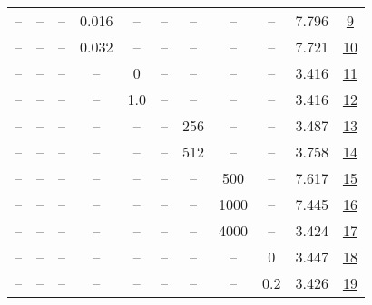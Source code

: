 \begin{table}[H]
\begin{tabular}{ccccccccccc}
-- & -- & -- & 0.016 & -- & -- & -- & -- & -- & 7.796 & \href{https://wandb.ai/stanford-mercury/optimizer-scaling/runs/sweep-130m-5B-mini3fbff3lr0.016-wd0.1-minlr0-warmup2000-b10.9-b2-e1ec05}{9} \\
-- & -- & -- & 0.032 & -- & -- & -- & -- & -- & 7.721 & \href{https://wandb.ai/stanford-mercury/optimizer-scaling/runs/sweep-130m-5B-minif2196dlr0.032-wd0.1-minlr0-warmup2000-b10.9-b2-bbaaf6}{10} \\
-- & -- & -- & -- & 0 & -- & -- & -- & -- & 3.416 & \href{https://wandb.ai/stanford-mercury/optimizer-scaling/runs/sweep-130m-5B-mini8d8c2clr0.008-wd0.1-minlr0-warmup2000-b10.9-b2-4ed1ed}{11} \\
-- & -- & -- & -- & 1.0 & -- & -- & -- & -- & 3.416 & \href{https://wandb.ai/stanford-mercury/optimizer-scaling/runs/sweep-130m-5B-mini40a6c3lr0.008-wd0.1-minlr0-warmup2000-b10.9-b2-ed39b1}{12} \\
-- & -- & -- & -- & -- & -- & 256 & -- & -- & 3.487 & \href{https://wandb.ai/stanford-mercury/optimizer-scaling/runs/sweep-130m-5B-mini4ff858lr0.008-wd0.1-minlr0-warmup2000-b10.9-b2-e5ff00}{13} \\
-- & -- & -- & -- & -- & -- & 512 & -- & -- & 3.758 & \href{https://wandb.ai/stanford-mercury/optimizer-scaling/runs/sweep-130m-5B-mini9232dclr0.008-wd0.1-minlr0-warmup2000-b10.9-b2-f9c99a}{14} \\
-- & -- & -- & -- & -- & -- & -- & 500 & -- & 7.617 & \href{https://wandb.ai/stanford-mercury/optimizer-scaling/runs/sweep-130m-5B-mini049b41lr0.008-wd0.1-minlr0-warmup500-b10.9-b20-54b29d}{15} \\
-- & -- & -- & -- & -- & -- & -- & 1000 & -- & 7.445 & \href{https://wandb.ai/stanford-mercury/optimizer-scaling/runs/sweep-130m-5B-mini0c45d6lr0.008-wd0.1-minlr0-warmup1000-b10.9-b2-a07cd7}{16} \\
-- & -- & -- & -- & -- & -- & -- & 4000 & -- & 3.424 & \href{https://wandb.ai/stanford-mercury/optimizer-scaling/runs/sweep-130m-5B-mini05a729lr0.008-wd0.1-minlr0-warmup4000-b10.9-b2-68948f}{17} \\
-- & -- & -- & -- & -- & -- & -- & -- & 0 & 3.447 & \href{https://wandb.ai/stanford-mercury/optimizer-scaling/runs/sweep-130m-5B-minicf80e8lr0.008-wd0-minlr0-warmup2000-b10.9-b20.-e3acc2}{18} \\
-- & -- & -- & -- & -- & -- & -- & -- & 0.2 & 3.426 & \href{https://wandb.ai/stanford-mercury/optimizer-scaling/runs/sweep-130m-5B-minimc35720lr0.008-wd0.2-minlr0-warmup2000-b10.9-b-54c1f6}{19} \\
\bottomrule
\end{tabular}
\end{table}

